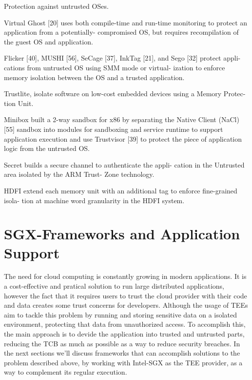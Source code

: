 Protection against untrusted OSes.

Virtual Ghost [20] uses both compile-time and run-time
monitoring to protect an application from a potentially-
compromised OS, but requires recompilation of the
guest OS and application.

Flicker [40], MUSHI [56],
SeCage [37], InkTag [21], and Sego [32] protect appli-
cations from untrusted OS using SMM mode or virtual-
ization to enforce memory isolation between the OS and
a trusted application.

Trustlite, isolate software
on low-cost embedded devices using a Memory Protec-
tion Unit.

Minibox built a 2-way sandbox for x86
by separating the Native Client (NaCl) [55] sandbox into
modules for sandboxing and service runtime to support
application execution and use Trustvisor [39] to protect
the piece of application logic from the untrusted OS.

Secret builds a secure channel to authenticate the appli-
cation in the Untrusted area isolated by the ARM Trust-
Zone technology.

HDFI extend each memory
unit with an additional tag to enforce fine-grained isola-
tion at machine word granularity in the HDFI system.








\section{SGX-Frameworks and Application Support} %
\label{sec:sgx_frameworks}


The need for cloud computing is constantly growing in modern applications. It is a cost-effective and pratical solution to run large distributed applications, however the fact that it requires users to trust the cloud provider with their code and data creates some trust concerns for developers.
Although the usage of TEEs aim to tackle this problem by running and storing sensitive data on a isolated environment, protecting that data from unauthorized access. To accomplish this, the main approach is to devide the application into trusted and untrusted parts, reducing the TCB as much as possible as a way to reduce security breaches. 
In the next sections we'll discuss frameworks that can accomplish solutions to the problem described above, by working with Intel-SGX as the TEE provider, as a way to complement its regular execution.




